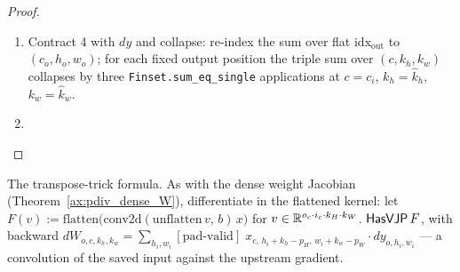 \begin{proof}
\begin{enumerate}
{    coordinate projection --- a reindex, whose Jacobian is the
    Kronecker indicator (Theorem~\ref{ax:pdiv_reindex}) --- or the
    zero function (Theorem~\ref{ax:pdiv_const}).}
  \item Contract 4 with \(dy\) and collapse: re-index the sum over
    flat \(\mathrm{idx_{out}}\) to \((c_o, h_o, w_o)\); for each
    fixed output position the triple sum over \((c, k_h, k_w)\)
    collapses by three \texttt{Finset.sum\_eq\_single} applications
    at \(c = c_i\), \(k_h = \hat{k}_h\), \(k_w = \hat{k}_w\).
  \item \Qed{}
\end{enumerate}
\end{proof}

\begin{theorem}
  \label{ax:conv2dWeightGradHasVJP}
  \leanok
  The transpose-trick formula. As with the dense weight
  Jacobian (Theorem~\ref{ax:pdiv_dense_W}), differentiate in the
  flattened kernel: let
  \(F(v) := \mathrm{flatten}\bigl(\mathrm{conv2d}
    (\mathrm{unflatten}\, v,\, b)\, x\bigr)\)
  for \(v \in \mathbb{R}^{o_c \cdot i_c \cdot k_H \cdot k_W}\).
  \Prove{} \(\mathsf{HasVJP}\, F\), with backward
  \(dW_{o, c, k_h, k_w} = \sum_{h_i, w_i}
    [\text{pad-valid}]\; x_{c,\, h_i + k_h - p_H,\, w_i + k_w - p_W}
    \cdot dy_{o, h_i, w_i}\)
  --- a convolution of the saved input against the upstream gradient.
\end{theorem}

